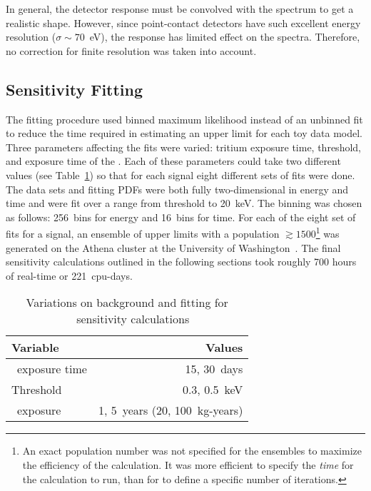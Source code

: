 	In general, the detector response must be convolved with the spectrum to get a realistic shape.  However, since point-contact detectors have such excellent energy resolution ($\sigma\sim70$~eV), the response has limited effect on the spectra.  Therefore, no correction for finite resolution was taken into account.  

		\subsection{Sensitivity Fitting}
		\label{sec:MJSensitivityFitting}
	
	The fitting procedure used binned maximum likelihood instead of an unbinned fit to reduce the time required in estimating an upper limit for each toy data model.  Three parameters affecting the fits were varied: tritium exposure time, threshold, and exposure time of the \minmod.  Each of these parameters could take two different values (see Table~\ref{tab:SensFitValues}) so that for each signal eight different sets of fits were done.  The data sets and fitting PDFs were both fully two-dimensional in energy and time and were fit over a range from threshold to 20~keV.  The binning was chosen as follows: 256~bins for energy and 16~bins for time.  For each of the eight set of fits for a signal, an ensemble of upper limits with a population $\gtrsim1500$\footnote{ An exact population number was not specified for the ensembles to maximize the efficiency of the calculation.  It was more efficient to specify the \emph{time} for the calculation to run, than for to define a specific number of iterations.} was generated on the Athena cluster at the University of Washington~\cite{Athena}.  The final sensitivity calculations outlined in the following sections took roughly 700 hours of real-time or 221~cpu-days.
	
			\begin{table}
				\centering
				\begin{tabular}{l r}
					\toprule
					Variable & Values \\
					\midrule
					\hthree~exposure time & 15, 30~days \\
					Threshold & 0.3, 0.5~keV \\
					\minmod~exposure & 1, 5~years (20, 100~kg-years) \\
					\bottomrule 
				\end{tabular}				
				\caption[Variations on background and fitting for \MJ~\minmod~sensitivity calculations]
				{Variations on background and fitting for \MJ~\minmod~sensitivity calculations}
				\label{tab:SensFitValues}
			\end{table}		
		
